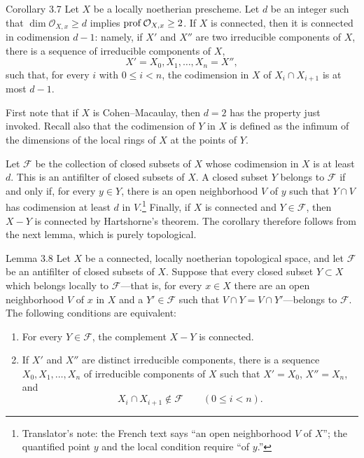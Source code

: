 \begin{sgastatement}{Corollary 3.7}
Let $X$ be a locally noetherian prescheme. Let $d$ be an integer such that
$\dim\mathcal O_{X,x}\ge d$ implies $\operatorname{prof}\mathcal O_{X,x}\ge2$. If $X$ is
connected, then it is connected in codimension $d-1$: namely, if $X'$ and
$X''$ are two irreducible components of $X$, there is a sequence of
irreducible components of $X$,
\[
  X'=X_0,X_1,\ldots,X_n=X'',
\]
such that, for every $i$ with $0\le i<n$, the codimension in $X$ of
$X_i\cap X_{i+1}$ is at most $d-1$.
\end{sgastatement}

First note that if $X$ is Cohen--Macaulay, then $d=2$ has the
property just invoked. Recall also that the codimension of $Y$ in $X$ is
defined as the infimum of the dimensions of the local rings of $X$ at the
points of $Y$.

\begin{proofbridge}
Let $\mathcal F$ be the collection of closed subsets of $X$ whose codimension
in $X$ is at least $d$. This is an antifilter of closed subsets of $X$. A
closed subset $Y$ belongs to $\mathcal F$ if and only if, for every $y\in Y$,
there is an open neighborhood $V$ of $y$ such that $Y\cap V$ has codimension
at least $d$ in $V$.\footnote{Translator's note: the French text says “an open
neighborhood $V$ of $X$”; the quantified point $y$ and the local condition
require “of $y$.\!”} Finally, if $X$ is connected and $Y\in\mathcal F$, then
$X-Y$ is connected by Hartshorne's theorem. The corollary therefore follows
from the next lemma, which is purely topological.
\end{proofbridge}


\begin{sgastatement}{Lemma 3.8}
Let $X$ be a connected, locally noetherian topological space, and let
$\mathcal F$ be an antifilter of closed subsets of $X$. Suppose that every
closed subset $Y\subset X$ which belongs locally to $\mathcal F$---that is,
for every $x\in X$ there are an open neighborhood $V$ of $x$ in $X$ and a
$Y'\in\mathcal F$ such that $V\cap Y=V\cap Y'$---belongs to $\mathcal F$.
The following conditions are equivalent:
\begin{enumerate}[label=\textup{(\roman*)},leftmargin=2.7em]
\item For every $Y\in\mathcal F$, the complement $X-Y$ is connected.
\item If $X'$ and $X''$ are distinct irreducible components, there is a
sequence $X_0,X_1,\ldots,X_n$ of irreducible components of $X$ such that
$X'=X_0$, $X''=X_n$, and
\[
  X_i\cap X_{i+1}\notin\mathcal F\qquad(0\le i<n).
\]
\end{enumerate}
\end{sgastatement}

